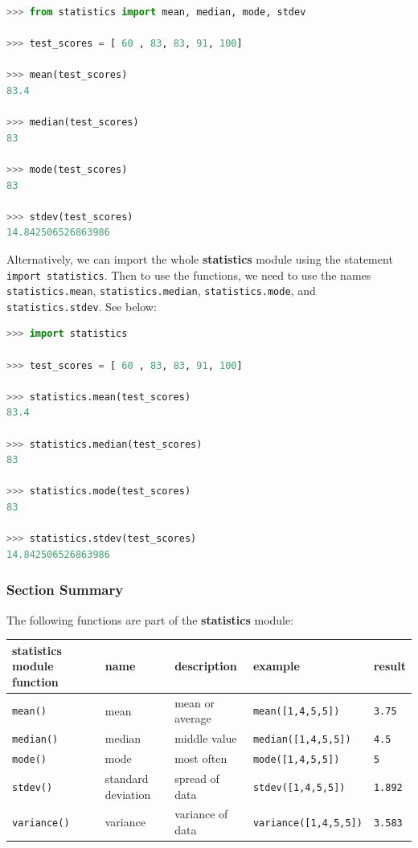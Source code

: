 \documentclass{book}
\begin{document}
\begin{lstlisting}[language=Python]
>>> from statistics import mean, median, mode, stdev
    
>>> test_scores = [ 60 , 83, 83, 91, 100]
    
>>> mean(test_scores)
83.4

>>> median(test_scores)
83

>>> mode(test_scores)
83
    
>>> stdev(test_scores)
14.842506526863986 
\end{lstlisting}

Alternatively, we can import the whole \textbf{statistics} module using
the statement \lstinline!import statistics!. Then to use the functions,
we need to use the names \lstinline!statistics.mean!,
\lstinline!statistics.median!, \lstinline!statistics.mode!, and
\lstinline!statistics.stdev!. See below:

\begin{lstlisting}[language=Python]
>>> import statistics
    
>>> test_scores = [ 60 , 83, 83, 91, 100]
    
>>> statistics.mean(test_scores)
83.4

>>> statistics.median(test_scores)
83

>>> statistics.mode(test_scores)
83
    
>>> statistics.stdev(test_scores)
14.842506526863986 
\end{lstlisting}

    \subsubsection{Section Summary}\label{section-summary}

The following functions are part of the \textbf{statistics} module:

\begin{longtable}[]{@{}lllll@{}}
\toprule
statistics module function & name & description & example &
result\tabularnewline
\midrule
\endhead
\lstinline!mean()! & mean & mean or average &
\lstinline!mean([1,4,5,5])! & \lstinline!3.75!\tabularnewline
\lstinline!median()! & median & middle value &
\lstinline!median([1,4,5,5])! & \lstinline!4.5!\tabularnewline
\lstinline!mode()! & mode & most often & \lstinline!mode([1,4,5,5])! &
\lstinline!5!\tabularnewline
\lstinline!stdev()! & standard deviation & spread of data &
\lstinline!stdev([1,4,5,5])! & \lstinline!1.892!\tabularnewline
\lstinline!variance()! & variance & variance of data &
\lstinline!variance([1,4,5,5])! & \lstinline!3.583!\tabularnewline
\bottomrule
\end{longtable}
\end{document}
